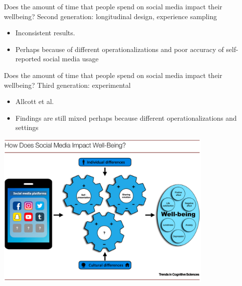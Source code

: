 \documentclass[aspectratio=169]{beamer}
\begin{document}
\begin{frame}

Does the amount of time that people spend on social media impact their wellbeing?  Second generation: longitudinal design, experience sampling \pause
\begin{itemize}
\item Inconsistent results.  \pause
\item Perhaps because of different operationalizations and poor accuracy of self-reported social media usage
\end{itemize}

\end{frame}
\begin{frame}

Does the amount of time that people spend on social media impact their wellbeing?  Third generation: experimental
\begin{itemize}
\item Allcott et al.\ \pause
\item Findings are still mixed perhaps because different operationalizations and settings
\end{itemize}

\end{frame}
\begin{frame}

\begin{center}
\includegraphics[width=0.8\textwidth]{figures/kross_social_2021_fig1}
\end{center}


\end{frame}
\end{document}
